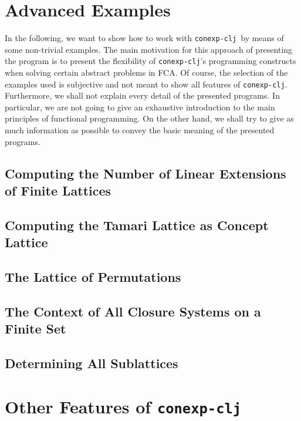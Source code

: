 \documentclass[oneside]{llncs}
\newcommand{\cclj}{\texttt{conexp-clj}\xspace}
\begin{document}
\section{Advanced Examples}
\label{sec:examples}

In the following, we want to show how to work with \cclj\ by means of some non-trivial
examples.  The main motivation for this approach of presenting the program is to present
the flexibility of \cclj's programming constructs when solving certain abstract problems
in FCA.  Of course, the selection of the examples used is subjective and not meant to show
all features of \cclj.  Furthermore, we shall not explain every detail of the presented
programs.  In particular, we are not going to give an exhaustive introduction to the main
principles of functional programming.  On the other hand, we shall try to give as much
information as possible to convey the basic meaning of the presented programs.

\subsection{Computing the Number of Linear Extensions of Finite Lattices}
\label{sec:comp-numb-line}


\subsection{Computing the Tamari Lattice as Concept Lattice}
\label{sec:comp-tamari-latt}

\subsection{The Lattice of Permutations}
\label{sec:lattice-permutations}

\subsection{The Context of All Closure Systems on a Finite Set}
\label{sec:context-all-closure}

\subsection{Determining All Sublattices}
\label{sec:determ-all-subl}

\section{Other Features of \cclj}
\label{sec:other-features-cclj}
\end{document}

